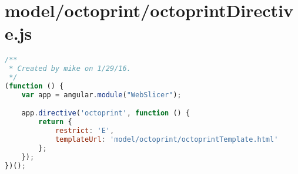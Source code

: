 \section{model/octoprint/octoprintDirective.js}
\begin{lstlisting}[language=JavaScript, label={lst:octoprintDirective}, caption=This directive bound the controller and the template for easy and multi-use integration into the index page.]
/**
 * Created by mike on 1/29/16.
 */
(function () {
    var app = angular.module("WebSlicer");

    app.directive('octoprint', function () {
        return {
            restrict: 'E',
            templateUrl: 'model/octoprint/octoprintTemplate.html'
        };
    });
})();
\end{lstlisting}

